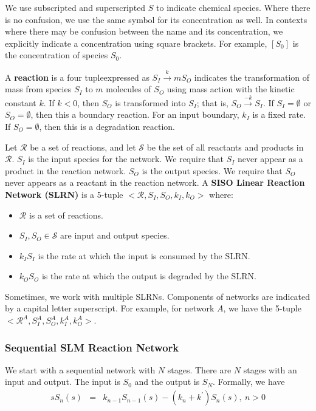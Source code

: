 \documentclass[unnumsec,webpdf,contemporary,large]{oup-authoring-template}%
\theoremstyle{thmstyleone}%
\theoremstyle{thmstyletwo}%
\theoremstyle{thmstylethree}%
\begin{document}
We use subscripted and superscripted $S$ to indicate chemical species. Where there is no confusion, we use the same symbol for its concentration as well. In contexts where there may be confusion between the name and its concentration, we explicitly indicate a concentration using square brackets. For example, $[S_0]$ is the concentration of species $S_0$.

A {\bf reaction} is a four tupleexpressed as $S_I \xrightarrow{k} m S_O$
indicates the transformation of mass from species $S_I$ to $m$ molecules of $S_O$
using mass action with the kinetic constant $k$. If $k < 0$,
then $S_O$ is transformed into $S_I$; that is, $S_O \xrightarrow{-k} S_I$.
If $S_I = \emptyset$ or $S_O = \emptyset$, then this a boundary reaction.
For an input boundary, $k_I$ is a fixed rate.
If $S_O = \emptyset$, then this is a degradation reaction.

Let $\mathcal{R}$ be a set of reactions, and let
$\mathcal{S}$ be the set of all reactants and products in $\mathcal{R}$.
$S_I$ is the input species for the network.
We require that $S_I$ never appear as a product in the reaction network.
$S_O$ is the output species.
We require that $S_O$ never appears as a reactant in the reaction network.
A {\bf SISO Linear Reaction Network (SLRN)} is
a 5-tuple
$<\mathcal{R}, S_I, S_O, k_I, k_O>$ where:
\begin{itemize}
    \item $\mathcal{R}$ is a set of reactions.
    \item 
    $S_I, S_O \in \mathcal{S}$ are input and output species.
    \item $k_I S_I$ is the rate at which the input is consumed
    by the SLRN.
    \item $k_O S_O$ is the rate at which the output is degraded by the SLRN.
\end{itemize}
Sometimes, we work with multiple SLRNs. Components of networks are indicated by a
capital letter superscript.
For example, for network $A$, we have the 5-tuple
$<\mathcal{R}^A, S^A_I, S^A_O, k^A_I, k^A_O>$.

\subsubsection{Sequential SLM Reaction Network}

We start with a sequential network with $N$ stages.
There are $N$ stages with an input and output. The input is $S_0$ and the output is $S_N$. Formally, we have
\begin{eqnarray}
s S_n (s) & =&  k_{n-1} S_{n-1} (s) - (k_n + k^{\prime}) S_n (s) ,~ n>0
\end{eqnarray}
\end{document}
